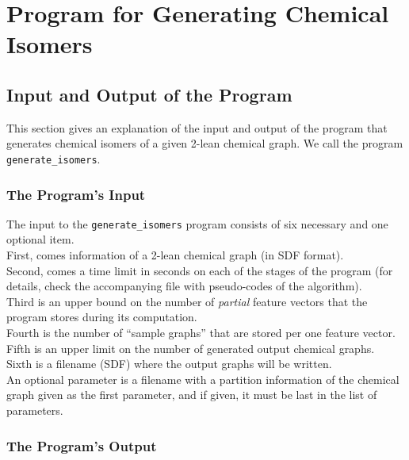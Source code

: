 \documentclass[11pt,titlepage,dvipdfmx,twoside]{book}
\begin{document}
\section{Program for Generating Chemical Isomers}
\label{chap: main}

\subsection{Input and Output of the Program}
\label{chap:InOut_m}

This section gives an explanation of the input and output
of the program that generates chemical isomers
of a given 2-lean chemical graph.
We call the program {\tt generate\_isomers}.

\subsubsection{The Program's Input}
\label{chap:Input_m}


The input to the {\tt generate\_isomers} program
consists of six necessary and one optional item. \\
First, comes information of a 2-lean chemical graph (in SDF format).\\
Second, comes a time limit in seconds on each of the stages of the program 
(for details, check the accompanying file with pseudo-codes of the algorithm).\\
Third is an upper bound on the number of {\em partial} feature vectors that the program stores
during its computation. \\
Fourth is the number of ``sample graphs'' that are stored per one feature vector.\\
Fifth is an upper limit on the number of generated output chemical graphs. \\
Sixth is a filename (SDF) where the output graphs will be written.\\
An optional parameter is a filename with a partition information of
the chemical graph given as the first parameter, and if given, it must be last
in the list of parameters.



\subsubsection{The Program's Output}
\label{chap:Output_m}
\end{document}
